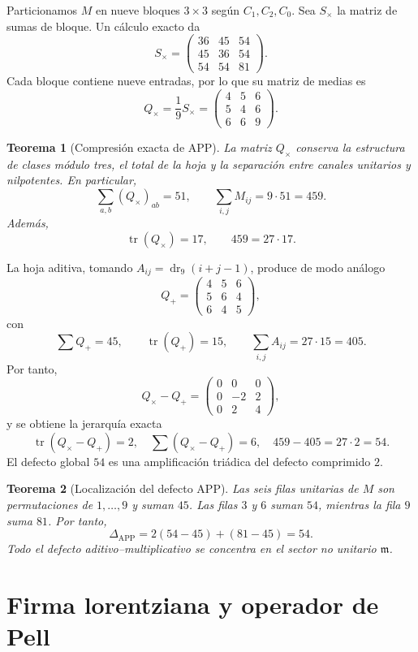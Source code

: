 \documentclass[11pt,a4paper]{article}
\newtheorem{teorema}{Teorema}
\newcommand{\dr}{\operatorname{dr}_9}
\newcommand{\APP}{\mathrm{APP}}
\newcommand{\Tr}{\operatorname{tr}}
\begin{document}
Particionamos $M$ en nueve bloques $3\times3$ según $C_1,C_2,C_0$. Sea $S_\times$ la matriz de sumas de bloque. Un cálculo exacto da
\[
\boxed{
S_\times=
\begin{pmatrix}
36&45&54\\
45&36&54\\
54&54&81
\end{pmatrix}.}
\]
Cada bloque contiene nueve entradas, por lo que su matriz de medias es
\[
\boxed{
Q_\times=\frac1{9}S_\times=
\begin{pmatrix}
4&5&6\\
5&4&6\\
6&6&9
\end{pmatrix}.}
\]

\begin{teorema}[Compresión exacta de APP]
La matriz $Q_\times$ conserva la estructura de clases módulo tres, el total de la hoja y la separación entre canales unitarios y nilpotentes. En particular,
\[
\sum_{a,b}(Q_\times)_{ab}=51,
\qquad
\sum_{i,j}M_{ij}=9\cdot51=459.
\]
Además,
\[
\Tr(Q_\times)=17,
\qquad
459=27\cdot17.
\]
\end{teorema}

La hoja aditiva, tomando $A_{ij}=\dr(i+j-1)$, produce de modo análogo
\[
Q_+=
\begin{pmatrix}
4&5&6\\
5&6&4\\
6&4&5
\end{pmatrix},
\]
con
\[
\sum Q_+=45,
\qquad
\Tr(Q_+)=15,
\qquad
\sum_{i,j}A_{ij}=27\cdot15=405.
\]
Por tanto,
\[
Q_\times-Q_+=
\begin{pmatrix}
0&0&0\\
0&-2&2\\
0&2&4
\end{pmatrix},
\]
y se obtiene la jerarquía exacta
\[
\boxed{
\Tr(Q_\times-Q_+)=2,
\quad
\sum(Q_\times-Q_+)=6,
\quad
459-405=27\cdot2=54.}
\]
El defecto global $54$ es una amplificación triádica del defecto comprimido $2$.

\begin{teorema}[Localización del defecto APP]
Las seis filas unitarias de $M$ son permutaciones de $1,\dots,9$ y suman $45$. Las filas $3$ y $6$ suman $54$, mientras la fila $9$ suma $81$. Por tanto,
\[
\Delta_{\APP}
=2(54-45)+(81-45)=54.
\]
Todo el defecto aditivo--multiplicativo se concentra en el sector no unitario $\mathfrak m$.
\end{teorema}

\section{Firma lorentziana y operador de Pell}
\end{document}
